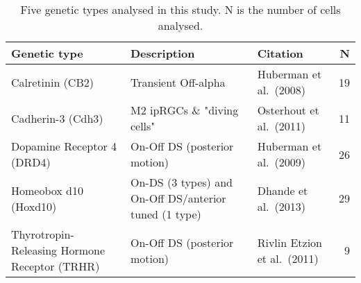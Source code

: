 \documentclass[11pt]{article}
\date{}
\begin{document}
\pagestyle{empty}

\singlespacing

\doublespacing

\newcommand{\etal}{et al.\ }
\begin{table}
\centering
\begin{tabular}{p{4.5cm} p{4.5cm} lr}
  \toprule
  Genetic type & Description & Citation & N\\
  \midrule
  \footnotesize{Calretinin (CB2)} & \footnotesize{Transient Off-alpha}
  & \footnotesize{Huberman \etal (2008)}& 19\\
  \footnotesize{Cadherin-3 (Cdh3)} & \footnotesize{M2 ipRGCs \&
    "diving cells"} & \footnotesize{Osterhout \etal (2011)}&11\\
  \footnotesize{Dopamine Receptor 4 (DRD4)} & \footnotesize{On-Off
    DS (posterior motion)} & \footnotesize{Huberman
    \etal (2009)}&26\\
  \footnotesize{Homeobox d10 (Hoxd10)} & \footnotesize{On-DS (3 types)
    and On-Off DS/anterior tuned (1 type)} 
  & \footnotesize{Dhande \etal (2013)} & 29\\
  \footnotesize{Thyrotropin-Releasing Hormone Receptor (TRHR)} &
  \footnotesize{On-Off DS (posterior motion)}&
  \footnotesize{Rivlin Etzion \etal (2011)} & 9\\
  \bottomrule
\end{tabular}
\caption{Five genetic types analysed in this study.  N is
  the number of cells analysed.}
\label{tab:geneticTypes}
\end{table}



\singlespacing
\end{document}
